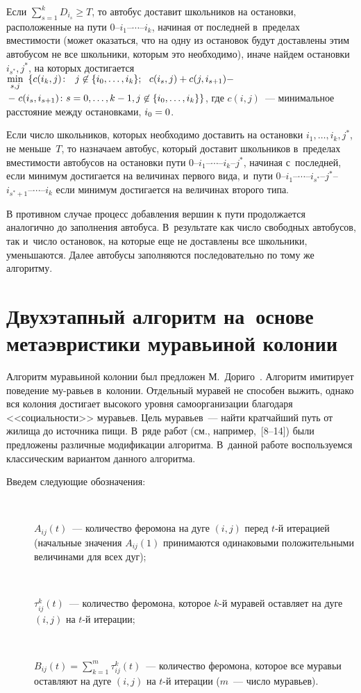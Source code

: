 \begin{multicols}{2}
     Если $\sum\nolimits_{s=1}^k D_{i_s} \geq T$, то автобус доставит школьников на
остановки, расположенные на пути 0--$i_1$--$\cdots$--$i_k$, начиная от
последней в~пределах вмес\-ти\-мости (может оказаться, что на одну из остановок
будут доставлены этим автобусом не все школьники, которым это необходимо),
иначе \mbox{найдем} остановки~$i_{s^*}, j^*$, на которых достигается
     $\min\limits_{s,j}\ \left\{
     c(i_k,j)\colon \ \ j\hm\not\in \{i_0,\ldots, i_k\};\ \
     c(i_s,j)\hm+c(j,i_{s+1}) \hm-\right.$\linebreak $\left.-\;c(i_s,i_{s+1})\colon
s\hm=0,\ldots, k-1, j\hm\not\in
\{i_0,\ldots, i_k\}
\right\}$,
где $c(i, j)$~--- минимальное расстояние между остановками, $i_0\hm =0$.

     Если число школьников, которых необходимо доставить на остановки
$i_1,\ldots, i_k, j^*$, не меньше~$T$, то назначаем автобус, который доставит
школьников в~пределах вместимости автобусов на остановки пути
     0--$i_1$--$\cdots$--$i_k$--$j^*$, начиная с~последней, если минимум
достигается на величинах первого вида, и~пути
     0--$i_1$--$\cdots$--$i_{s^*}$--$j^*$--$i_{s^*+1}$--$\cdots$--$i_k$ если
минимум достигается на величинах второго типа.

     В противном случае процесс добавления вершин к пути продолжается
аналогично до заполнения автобуса. В~результате как число свободных
автобусов, так и~число остановок, на которые еще не доставлены все
школьники, уменьшаются. Далее автобусы заполняются последовательно по
тому же алгоритму.

\section{Двухэтапный алгоритм на~основе метаэвристики
муравьиной колонии}

     Алгоритм муравьиной колонии был предложен М.~Дориго~\cite{7-va}.
Алгоритм имитирует поведение му-\linebreak равьев в~колонии. Отдельный муравей не
\mbox{способен} выжить, однако вся колония достигает высокого уровня
самоорганизации благодаря <<со\-ци\-аль\-ности>> муравьев. Цель муравьев~---
найти кратчайший путь от жилища до источника пищи. В~ряде работ
(см., например,~[8--14]) были предложены различные модификации алгоритма.
В~данной работе воспользуемся классическим вариантом данного алгоритма.

     Введем следующие обозначения:
\begin{description}
\item[\,]     $A_{ij}(t)$~--- количество феромона на дуге $(i, j)$ перед $t$-й итерацией
(начальные значения $A_{ij}(1)$ принимаются одинаковыми положительными
величинами для всех дуг);
\item[\,]
     $\tau_{ij}^k(t)$~--- количество феромона, которое $k$-й муравей
оставляет на дуге $(i,j)$ на $t$-й итерации;
\item[\,]
     $B_{ij}(t)=\sum\nolimits_{k=1}^m \tau_{ij}^k(t)$~--- количество феромона,
которое все муравьи оставляют на дуге $(i,j)$ на $t$-й итерации ($m$~--- число
муравьев).
\end{description}


\end{multicols}
